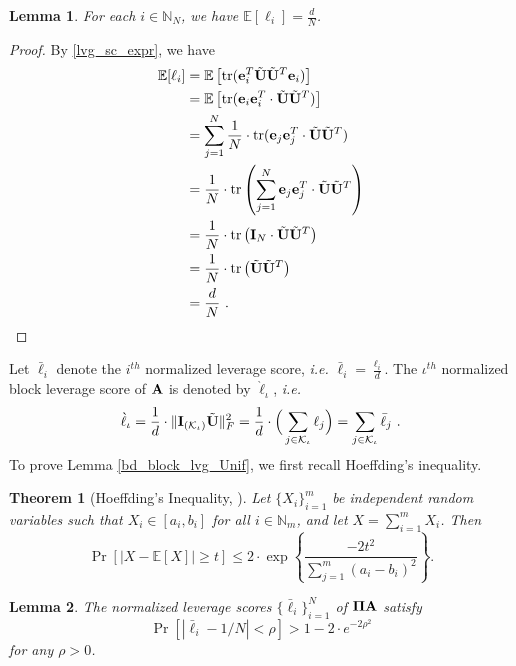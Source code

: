 \documentclass[journal,letterpaper,onecolumn,twoside,nofonttune]{IEEEtran}
\newcommand{\K}{\mathcal{K}}
\newcommand{\ellb}{\bar{\ell}}
\newcommand{\ellg}{\grave{\ell}}
\newcommand{\Pibold}{\bold{\Pi}}
\newcommand{\E}{\mathbb{E}}
\newcommand{\N}{\mathbb{N}}
\newcommand{\Ab}{\bold{A}}
\newcommand{\eb}{\bold{e}}
\newcommand{\Ib}{\bold{I}}
\newcommand{\Ubt}{\tilde{\bold{U}}}
\DeclareMathOperator{\tr}{tr}
\newtheorem{Thm}{Theorem}
\newtheorem{Lemma}{Lemma}
\begin{document}
\begin{Lemma}
\label{Lemma_exp_lev_i}
For each $i\in\N_N$, we have $\E[\ell_i]=\frac{d}{N}$.
\end{Lemma}

\begin{proof}
By \eqref{lvg_sc_expr}, we have
\begin{align*}
  \E[\ell_i] &= \E\left[\tr(\eb_i^T\Ubt\Ubt^T\eb_i)\right]\\
  &= \E\left[\tr(\eb_i\eb_i^T\cdot\Ubt\Ubt^T)\right]\\
  &= \sum_{j=1}^N\frac{1}{N}\cdot\tr(\eb_j\eb_j^T\cdot\Ubt\Ubt^T)\\
  &= \frac{1}{N}\cdot\tr\left(\sum_{j=1}^N\eb_j\eb_j^T\cdot\Ubt\Ubt^T\right)\\
  &= \frac{1}{N}\cdot\tr\left(\Ib_N\cdot\Ubt\Ubt^T\right)\\
  &= \frac{1}{N}\cdot\tr\left(\Ubt\Ubt^T\right)\\
  &= \frac{d}{N}\ .
\end{align*}
\end{proof}

Let $\ellb_i$ denote the $i^{th}$ normalized leverage score, \textit{i.e.} $\ellb_i=\frac{\ell_i}{d}$. The $\iota^{th}$ normalized block leverage score of $\Ab$ is denoted by $\ellg_\iota$, \textit{i.e.}
\begin{equation}
\label{norm_bl_lvg_sc_expr}
  \ellg_\iota=\frac{1}{d}\cdot\|\Ib_{(\K_\iota)}\Ubt\|_F^2=\frac{1}{d}\cdot\Big(\sum_{j\in\K_\iota}\ell_j\Big)=\sum_{j\in\K_\iota}\ellb_j\ .
\end{equation}
To prove Lemma \ref{bd_block_lvg_Unif}, we first recall Hoeffding's inequality.

\begin{Thm}[Hoeffding's Inequality, \cite{Mah16}]
\label{Hoef_in}
Let $\{X_i\}_{i=1}^m$ be independent random variables such that $X_i\in[a_i,b_i]$ for all $i\in\N_m$, and let $X=\sum_{i=1}^mX_i$. Then
\begin{equation*}
\label{Hoeffding_id}
  \Pr\left[\big|X-\E[X]\big|\geqslant t\right] \leqslant 2\cdot\exp\left\{\frac{-2t^2}{\sum_{j=1}^m(a_i-b_i)^2}\right\}.
\end{equation*}
\end{Thm}

\begin{Lemma}
\label{norm_lvg_bd_lemma}
The normalized leverage scores $\{\ellb_i\}_{i=1}^N$ of $\Pibold\Ab$ satisfy
$$ \Pr\left[|\ellb_i-1/N|<\rho\right] > 1-2\cdot e^{-2\rho^2} $$
for any $\rho>0$.
\end{Lemma}
\end{document}
